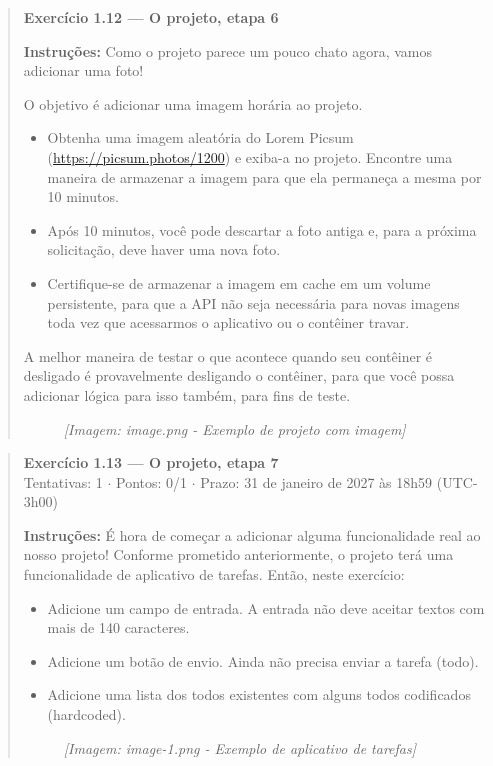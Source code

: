 \documentclass[11pt,a4paper]{article}
\begin{document}
\begin{quote}
\textbf{Exercício 1.12 --- O projeto, etapa 6}

\textbf{Instruções:} Como o projeto parece um pouco chato agora, vamos adicionar uma foto!

O objetivo é adicionar uma imagem horária ao projeto.

\begin{itemize}
    \item Obtenha uma imagem aleatória do Lorem Picsum (\url{https://picsum.photos/1200}) e exiba-a no projeto. Encontre uma maneira de armazenar a imagem para que ela permaneça a mesma por 10 minutos.
    \item Após 10 minutos, você pode descartar a foto antiga e, para a próxima solicitação, deve haver uma nova foto.
    \item Certifique-se de armazenar a imagem em cache em um volume persistente, para que a API não seja necessária para novas imagens toda vez que acessarmos o aplicativo ou o contêiner travar.
\end{itemize}

A melhor maneira de testar o que acontece quando seu contêiner é desligado é provavelmente desligando o contêiner, para que você possa adicionar lógica para isso também, para fins de teste.

\begin{figure}[h]
\centering
\textit{[Imagem: image.png - Exemplo de projeto com imagem]}
\end{figure}
\end{quote}

\begin{quote}
\textbf{Exercício 1.13 --- O projeto, etapa 7}\\
Tentativas: 1 $\cdot$ Pontos: 0/1 $\cdot$ Prazo: 31 de janeiro de 2027 às 18h59 (UTC-3h00)

\textbf{Instruções:} É hora de começar a adicionar alguma funcionalidade real ao nosso projeto! Conforme prometido anteriormente, o projeto terá uma funcionalidade de aplicativo de tarefas. Então, neste exercício:

\begin{itemize}
    \item Adicione um campo de entrada. A entrada não deve aceitar textos com mais de 140 caracteres.
    \item Adicione um botão de envio. Ainda não precisa enviar a tarefa (todo).
    \item Adicione uma lista dos todos existentes com alguns todos codificados (hardcoded).
\end{itemize}

\begin{figure}[h]
\centering
\textit{[Imagem: image-1.png - Exemplo de aplicativo de tarefas]}
\end{figure}
\end{quote}
\end{document}
